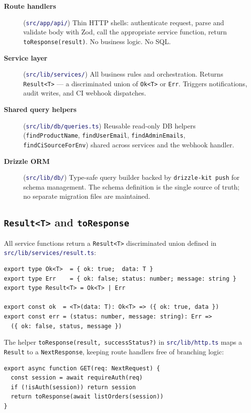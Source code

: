 \documentclass[12pt,a4paper,twoside]{report}
\newcommand{\code}[1]{\texttt{#1}}
\newcommand{\file}[1]{\texttt{\textcolor{MidnightBlue}{#1}}}
\begin{document}
\begin{description}
  \item[\textbf{Route handlers}] (\file{src/app/api/})
    Thin HTTP shells: authenticate request, parse and validate body with
    Zod, call the appropriate service function, return \code{toResponse(result)}.
    No business logic. No SQL.
  \item[\textbf{Service layer}] (\file{src/lib/services/})
    All business rules and orchestration. Returns \code{Result<T>} —
    a discriminated union of \code{Ok<T>} or \code{Err}. Triggers
    notifications, audit writes, and CI webhook dispatches.
  \item[\textbf{Shared query helpers}] (\file{src/lib/db/queries.ts})
    Reusable read-only DB helpers (\code{findProductName},
    \code{findUserEmail}, \code{findAdminEmails},
    \code{findCiSourceForEnv}) shared across services and the
    webhook handler.
  \item[\textbf{Drizzle ORM}] (\file{src/lib/db/})
    Type-safe query builder backed by \code{drizzle-kit push} for
    schema management. The schema definition is the single source of
    truth; no separate migration files are maintained.
\end{description}

\subsection*{\texttt{Result<T>} and \texttt{toResponse}}

All service functions return a \code{Result<T>} discriminated union
defined in \file{src/lib/services/result.ts}:

\begin{lstlisting}[style=ts]
export type Ok<T>  = { ok: true;  data: T }
export type Err    = { ok: false; status: number; message: string }
export type Result<T> = Ok<T> | Err

export const ok  = <T>(data: T): Ok<T> => ({ ok: true, data })
export const err = (status: number, message: string): Err =>
  ({ ok: false, status, message })
\end{lstlisting}

The helper \code{toResponse(result, successStatus?)} in
\file{src/lib/http.ts} maps a \code{Result} to a \code{NextResponse},
keeping route handlers free of branching logic:

\begin{lstlisting}[style=ts]
export async function GET(req: NextRequest) {
  const session = await requireAuth(req)
  if (!isAuth(session)) return session
  return toResponse(await listOrders(session))
}
\end{lstlisting}
\end{document}
